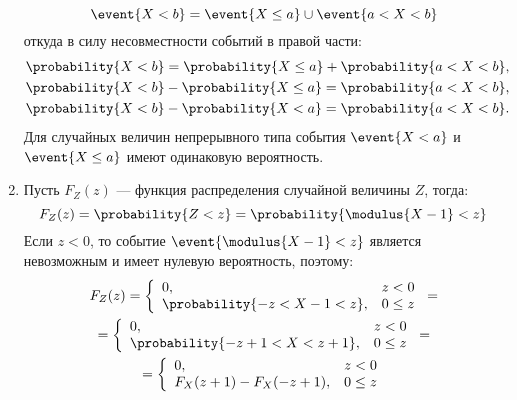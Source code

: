 \begin{enumerate}
\begin{equation}
        \event{X < b} = \event{X \leq a} \cup \event{a < X < b}
    \end{equation}
    откуда в силу несовместности событий в правой части:
    \begin{gather}
        \probability{X < b} = \probability{X \leq a} + \probability{a < X < b} , \\
        \probability{X < b} - \probability{X \leq a} = \probability{a < X < b} , \\
        \probability{X < b} - \probability{X < a} = \probability{a < X < b} .
    \end{gather}
    Для случайных величин непрерывного типа события $\event{X < a}$ и $\event{X \leq a}$ имеют одинаковую вероятность.

    \item Пусть $F_Z(z)$ --- функция распределения случайной величины $Z$, тогда:
    \begin{equation}
        F_Z(z) = \probability{Z < z} = \probability{\modulus{X - 1} < z}
    \end{equation}
    Если $z < 0$, то событие $\event{\modulus{X - 1} < z}$ является невозможным и имеет нулевую вероятность, поэтому:
    \begin{multline}
        F_Z(z)
        = \left \{
        \begin{array}{ll}
            0,                            & z < 0    \\
            \probability{-z < X - 1 < z}, & 0 \leq z
        \end{array}
        \right . = \\
        = \left \{
        \begin{array}{ll}
            0,                                & z < 0    \\
            \probability{-z + 1 < X < z + 1}, & 0 \leq z
        \end{array}
        \right . = \\
        = \left \{
        \begin{array}{ll}
            0,                        & z < 0    \\
            F_X(z + 1) - F_X(-z + 1), & 0 \leq z
        \end{array}
        \right .
    \end{multline}


\end{enumerate}
